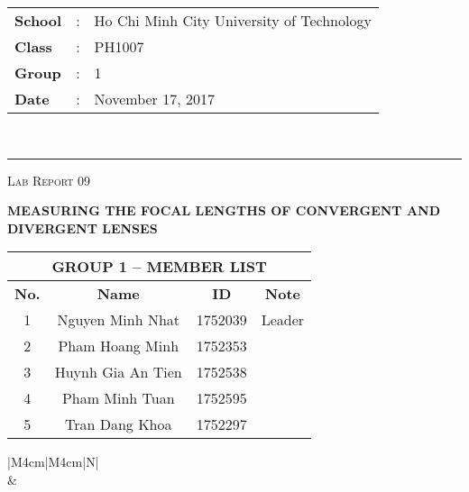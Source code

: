 \documentclass[12pt, a4paper]{article}
\begin{document}
\noindent
\begin{tabular}{lll}
    \textbf{School} & : & Ho Chi Minh City University of Technology \\
    \textbf{Class} & : & PH1007 \\
    \textbf{Group} & : & 1 \\
    \textbf{Date} & : & November 17, 2017 \\
\end{tabular}\\
\rule[2ex]{\textwidth}{2pt}

\vspace{2cm}

\begin{center}
    {\scshape\Large Lab Report 09 \par}
    \vspace{1.5cm}
    {\Huge\bfseries MEASURING THE FOCAL LENGTHS OF CONVERGENT AND DIVERGENT LENSES \par}
    \vspace{3cm}
    \begin{tabular}{|c|c|c|c|}
        \hline 
        \multicolumn{4}{|c|}{\textbf{GROUP 1 -- MEMBER LIST}} \\ 
        \hline 
        \textbf{No.} &\qquad\qquad \textbf{Name}\qquad\qquad\qquad & \qquad\textbf{ID}\qquad\qquad & \qquad\textbf{Note}\qquad\qquad \\ 
        \hline 
        1 & Nguyen Minh Nhat  & 1752039 & Leader \\ 
        \hline 
        2 & Pham Hoang Minh   & 1752353 &  \\ 
        \hline 
        3 & Huynh Gia An Tien & 1752538 &  \\ 
        \hline 
        4 & Pham Minh Tuan    & 1752595 &  \\ 
        \hline 
        5 & Tran Dang Khoa    & 1752297 &  \\ 
        \hline 
    \end{tabular} 

    \vspace{3cm}

    \begin{table}[ht]
        \centering
        \begin{tabular}{|M{4cm}|M{4cm}|N|}
            \hline
             \\
            \hline
             &  \\ [50pt]
            \hline
        \end{tabular}
    \end{table}
\end{center}
\end{document}
